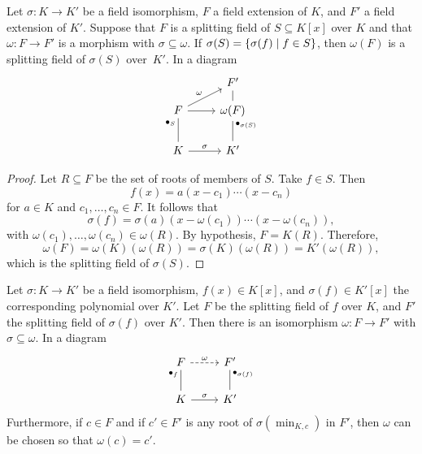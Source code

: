 \begin{lem}\label{lem:algebraic-extension-2}
    Let\/ $\sigma\colon K \to K'$ be a field isomorphism,  $F$ a field extension of\/ $K$, and\/ $F'$ a field extension of\/ $K'$. Suppose that\/ $F$ is a splitting field of\/ $S\subseteq K[x]$ over\/ $K$ and that\/ $\omega\colon F\to F'$ is a morphism with\/ $\sigma\subseteq\omega$. If\/ $\sigma(S)=\{\sigma(f)\mid f\in S\}$, then\/ $\omega(F)$ is a splitting field of\/ $\sigma(S)$ over\/~$K'$. In a diagram
    $$
        \begin{tikzcd}
                &F'\\[-0.3cm]
            F
                    \arrow[ru,"\omega"]
                    \arrow[r]
                &\omega(F)
                    \arrow[u,no head]\\
            K
                    \arrow[u,"\sfld_S",no head,pos=0.8]
                    \arrow[r,"\sigma"]
                &K'
                    \arrow[u,"\sfld_{\sigma(S)}"',no head,pos=0.8]
        \end{tikzcd}
            $$
        \end{lem}

\begin{proof}
    Let $R\subseteq F$ be the set of roots of members of $S$. Take $f\in S$. Then
    $$
        f(x) = a(x-c_1)\cdots(x-c_n)
    $$
    for $a\in K$ and $c_1,\dots,c_n\in F$. It follows that
    $$
        \sigma(f) = \sigma(a)(x-\omega(c_1))\cdots(x-\omega(c_n)),
    $$
    with $\omega(c_1),\dots,\omega(c_n)\in\omega(R)$.  By hypothesis, $F=K(R)$. Therefore,
    $$
        \omega(F) = \omega(K)(\omega(R))
            = \sigma(K)(\omega(R))
            = K'(\omega(R)),
    $$
    which is the splitting field of $\sigma(S)$. 
\end{proof}

\begin{thm}
    Let\/ $\sigma\colon K\to K'$ be a field isomorphism, $f(x)\in K[x]$, and\/ $\sigma(f)\in K'[x]$ the corresponding polynomial over\/ $K'$. Let\/ $F$ be the splitting field of\/ $f$ over\/ $K$, and\/ $F'$ the splitting field of\/ $\sigma(f)$ over\/ $K'$. Then there is an isomorphism\/ $\omega\colon F\to F'$ with\/ $\sigma\subseteq\omega$. In a diagram
    $$
        \begin{tikzcd}
            F
                    \arrow[r,"\omega",dashed]
                &F'\\
            K
                    \arrow[r,"\sigma"]
                    \arrow[u,"\sfld_f",no head,pos=0.8]
                &K'
                    \arrow[u,"\sfld_{\sigma(f)}"',no head,pos=0.8]
        \end{tikzcd}
    $$
    Furthermore, if\/ $c\in F$ and if\/ $c'\in F'$ is any root of\/ $\sigma(\min_{K,c})$ in\/ $F'$, then\/ $\omega$ can be chosen so that\/ $\omega(c)=c'$.
\end{thm}


